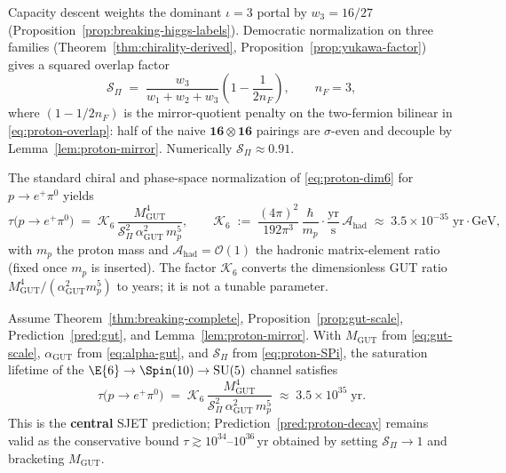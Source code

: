 Capacity descent weights the dominant $\iota=3$ portal by
$w_3=16/27$ (Proposition~\ref{prop:breaking-higgs-labels}). Democratic
normalization on three families (Theorem~\ref{thm:chirality-derived},
Proposition~\ref{prop:yukawa-factor}) gives a squared overlap factor
\begin{equation}\label{eq:proton-SPi}
  \mathcal{S}_\Pi
  \;=\;
  \frac{w_3}{w_1+w_2+w_3}
  \left(1-\frac{1}{2n_F}\right),
  \qquad
  n_F=3,
\end{equation}
where $(1-1/2n_F)$ is the mirror-quotient penalty on the two-fermion bilinear
in \eqref{eq:proton-overlap}: half of the naive $\mathbf{16}\otimes\mathbf{16}$
pairings are $\sigma$-even and decouple by Lemma~\ref{lem:proton-mirror}.
Numerically $\mathcal{S}_\Pi\approx 0.91$.

The standard chiral and phase-space normalization of \eqref{eq:proton-dim6}
for $p\to e^+\pi^0$ yields~\cite{GeorgiGlashow1974,Witten1985}
\begin{equation}\label{eq:proton-rate}
  \tau\!\bigl(p\to e^+\pi^0\bigr)
  \;=\;
  \mathcal{K}_{6}\,
  \frac{M_{\mathrm{GUT}}^{4}}
       {\mathcal{S}_\Pi^{2}\,\alpha_{\mathrm{GUT}}^{2}\,m_{p}^{5}},
  \qquad
  \mathcal{K}_{6}
  \;:=\;
  \frac{(4\pi)^2}{192\pi^3}\,
  \frac{\hbar}{m_{p}}\cdot\frac{\mathrm{yr}}{\mathrm{s}}\,
  \mathcal{A}_{\mathrm{had}}
  \;\approx\;
  3.5\times 10^{-35}\;\mathrm{yr\cdot GeV},
\end{equation}
with $m_p$ the proton mass and $\mathcal{A}_{\mathrm{had}}=\mathcal{O}(1)$ the
hadronic matrix-element ratio (fixed once $m_p$ is inserted). The factor
$\mathcal{K}_{6}$ converts the dimensionless GUT ratio
$M_{\mathrm{GUT}}^{4}/(\alpha_{\mathrm{GUT}}^{2}m_{p}^{5})$ to years; it is
not a tunable parameter.

\begin{theorem}\label{thm:proton-decay-rate}
Assume Theorem~\ref{thm:breaking-complete},
Proposition~\ref{prop:gut-scale}, Prediction~\ref{pred:gut}, and
Lemma~\ref{lem:proton-mirror}. With $M_{\mathrm{GUT}}$ from
\eqref{eq:gut-scale}, $\alpha_{\mathrm{GUT}}$ from \eqref{eq:alpha-gut}, and
$\mathcal{S}_\Pi$ from \eqref{eq:proton-SPi}, the saturation lifetime of the
$\E{6}\to\Spin(10)\to\mathrm{SU}(5)$ channel satisfies
\begin{equation}\label{eq:proton-tau-sat}
  \tau\!\bigl(p\to e^+\pi^0\bigr)
  \;=\;
  \mathcal{K}_{6}\,
  \frac{M_{\mathrm{GUT}}^{4}}
       {\mathcal{S}_\Pi^{2}\,\alpha_{\mathrm{GUT}}^{2}\,m_{p}^{5}}
  \;\approx\;
  3.5\times 10^{35}\;\mathrm{yr}.
\end{equation}
This is the \textbf{central} SJET prediction; Prediction~\ref{pred:proton-decay}
remains valid as the conservative bound
$\tau\gtrsim 10^{34}$--$10^{36}\,\mathrm{yr}$ obtained by setting
$\mathcal{S}_\Pi\to 1$ and bracketing $M_{\mathrm{GUT}}$.
\end{theorem}

